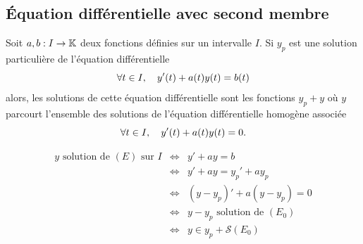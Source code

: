 \documentclass{magnoliaold}
\begin{document}
\subsection{Équation différentielle avec second membre}

\begin{proposition}[utile=-3,nom={Théorème de superposition}]
Soit $a,b:I\to\mathbb{K}$ deux fonctions définies sur un intervalle $I$. Si
$y_p$ est une solution \og particulière \fg de l'équation différentielle
\[\forall t\in I,\quad y'(t)+a(t) y(t)=b(t)\]
alors, les solutions de cette équation différentielle sont les fonctions $y_p+y$
où $y$ parcourt l'ensemble des solutions de l'équation différentielle homogène
associée
\[\forall t\in I ,\quad y'(t)+a(t) y(t)=0.\]
\end{proposition}

\begin{preuve}
\begin{eqnarray*}
y \text{ solution de } (E) \text{ sur } I&\Longleftrightarrow & y'+ay=b \\
&\Longleftrightarrow & y'+ay=y_p'+ay_p \\
&\Longleftrightarrow &(y-y_p)'+a(y-y_p)=0\\
&\Longleftrightarrow & y-y_p \text{ solution de } (E_0)\\
&\Longleftrightarrow & y\in y_p+\mathcal{S}(E_0)
\end{eqnarray*}

\end{preuve}
\end{document}

